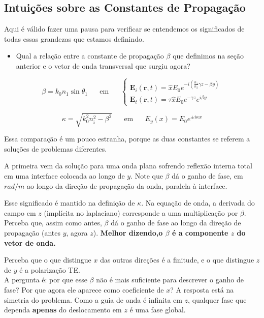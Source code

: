 \documentclass[12pt,a4paper]{report}
\begin{document}
\subsection{Intuições sobre as Constantes de Propagação}

Aqui é válido fazer uma pausa para verificar se entendemos os significados de todas essas grandezas que estamos definindo.

\begin{itemize}
    \item Qual a relação entre a constante de propagação $\beta$ que definimos na seção anterior e o vetor de onda transversal que surgiu agora?
\end{itemize}

\begin{equation*}
    \beta=k_0n_1\sin\theta_1\;\;\;\;\;\;\text{em}\;\;\;\;\;\;\begin{cases}
    \textbf{E}_i(\textbf{r},t)=\hat{x}E_0e^{-i(\frac{n_1}{n_2}\gamma z-\beta y)}\\
    
    \textbf{E}_t(\textbf{r},t)=\tau\hat{x}E_0e^{-\gamma z}e^{i\beta y}
    \end{cases}
\end{equation*}

\begin{equation*}
    \kappa=\sqrt{k_0^2n_i^2-\beta^2}\;\;\;\;\;\;\text{em}\;\;\;\;\;\;E_y(x)=E_0e^{\pm i\kappa x}
\end{equation*}

Essa comparação é um pouco estranha, porque as duas constantes se referem a soluções de problemas diferentes.

A primeira vem da solução para uma onda plana sofrendo reflexão interna total em uma interface colocada ao longo de $y$. Note que $\beta$ dá o ganho de fase, em $rad/m$ ao longo da direção de propagação da onda, paralela à interface.

Esse significado é mantido na definição de $\kappa$. Na equação de onda, a derivada do campo em $z$ (implícita no laplaciano) corresponde a uma multiplicação por $\beta$. Perceba que, assim como antes, $\beta$ dá o ganho de fase ao longo da direção de propagação (antes $y$, agora $z$). \textbf{Melhor dizendo,o $\beta$ é a componente $z$ do vetor de onda.}

Perceba que o que distingue $x$ das outras direções é a finitude, e o que distingue $z$ de $y$ é a polarização TE.\\

A pergunta é: por que esse $\beta$ não é mais suficiente para descrever o ganho de fase? Por que agora ele aparece como coeficiente de $x$? A resposta está na simetria do problema. Como a guia de onda é infinita em $z$, qualquer fase que dependa \textbf{apenas} do deslocamento em $z$ é uma fase global.
\end{document}
